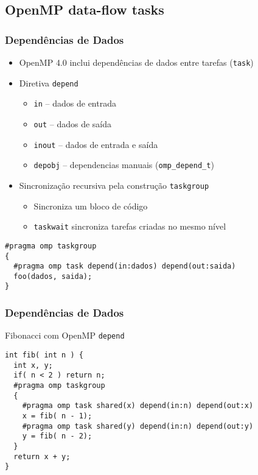\subsection{OpenMP data-flow tasks}

\begin{frame}[fragile]
  \frametitle{Dependências de Dados}
  \begin{itemize}
  \item OpenMP 4.0 inclui dependências de dados entre tarefas (\texttt{task})
  \pause
  \item Diretiva \texttt{depend}
    \begin{itemize}
    \item \texttt{in} -- dados de entrada
    \item \texttt{out} -- dados de saída
    \item \texttt{inout} -- dados de entrada e saída
    \item \texttt{depobj} -- dependencias manuais (\texttt{omp_depend_t})
    \end{itemize}
  \pause
  \item Sincronização recursiva pela construção \texttt{taskgroup}
    \begin{itemize}
    \item Sincroniza um bloco de código
    \item \texttt{taskwait} \alert{sincroniza tarefas criadas no mesmo nível}
    \end{itemize}
  \end{itemize}
%
\pause
%
\begin{minipage}{0.95\textwidth}  
  \begin{verbatim}  
#pragma omp taskgroup
{
  #pragma omp task depend(in:dados) depend(out:saida)
  foo(dados, saida);
}
\end{verbatim}
\end{minipage}
%
\end{frame}
\begin{frame}[fragile]
  \frametitle{Dependências de Dados}
Fibonacci com OpenMP \texttt{depend}
\begin{minipage}{0.95\textwidth}  
\begin{verbatim}  
int fib( int n ) {
  int x, y;
  if( n < 2 ) return n;
  #pragma omp taskgroup
  {
    #pragma omp task shared(x) depend(in:n) depend(out:x)
    x = fib( n - 1);
    #pragma omp task shared(y) depend(in:n) depend(out:y)
    y = fib( n - 2);
  }
  return x + y;
}
\end{verbatim}
\end{minipage}
\end{frame}


